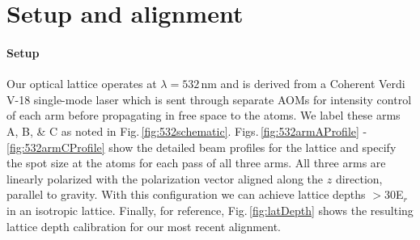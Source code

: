 
\section{Setup and alignment} \label{sssec:532_align}
\paragraph{Setup}\label{ssec:lattice_setup}
Our optical lattice operates at $\lambda=532\,$nm and is derived from a Coherent Verdi V-18 single-mode laser which is sent through separate AOMs for intensity control of each arm before propagating in free space to the atoms. 
We label these arms A, B, \& C as noted in Fig.\,\ref{fig:532schematic}.
Figs.\,\ref{fig:532armAProfile} - \ref{fig:532armCProfile} show the detailed beam profiles for the lattice and specify the spot size at the atoms for each pass of all three arms.
All three arms are linearly polarized with the polarization vector aligned along the $z$ direction, parallel to gravity.
With this configuration we can achieve lattice depths $>30$E$_r$ in an isotropic lattice.
Finally, for reference, Fig.\,\ref{fig:latDepth} shows the resulting lattice depth calibration for our most recent alignment.


